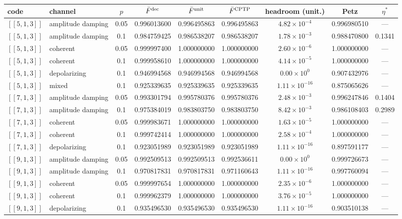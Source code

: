 \documentclass[10pt,a4paper]{article}
\begin{document}
\begin{longtable}{llccccccc}
\toprule code & channel & $p$ & $\bar F^{\rm dec}$ & $\bar F^{\rm unit}$ & $\bar F^{\rm CPTP}$ & headroom (unit.) & Petz & $\eta^\ast$ \\ \midrule
$[\![5,1,3]\!]$ & amplitude damping & 0.05 & 0.996013600 & 0.996495863 & 0.996495863 & $4.82\times 10^{-4}$ & 0.996980510 & --- \\
$[\![5,1,3]\!]$ & amplitude damping & 0.1 & 0.984759425 & 0.986538207 & 0.986538207 & $1.78\times 10^{-3}$ & 0.988470800 & 0.1341 \\
$[\![5,1,3]\!]$ & coherent & 0.05 & 0.999997400 & 1.000000000 & 1.000000000 & $2.60\times 10^{-6}$ & 1.000000000 & --- \\
$[\![5,1,3]\!]$ & coherent & 0.1 & 0.999958610 & 1.000000000 & 1.000000000 & $4.14\times 10^{-5}$ & 1.000000000 & --- \\
$[\![5,1,3]\!]$ & depolarizing & 0.1 & 0.946994568 & 0.946994568 & 0.946994568 & $0.00\times 10^{0}$ & 0.907432976 & --- \\
$[\![5,1,3]\!]$ & mixed & 0.1 & 0.925339635 & 0.925339635 & 0.925339635 & $1.11\times 10^{-16}$ & 0.875065626 & --- \\
\midrule
$[\![7,1,3]\!]$ & amplitude damping & 0.05 & 0.993301794 & 0.995780376 & 0.995780376 & $2.48\times 10^{-3}$ & 0.996247846 & 0.1404 \\
$[\![7,1,3]\!]$ & amplitude damping & 0.1 & 0.975384019 & 0.983803750 & 0.983803750 & $8.42\times 10^{-3}$ & 0.986108403 & 0.2989 \\
$[\![7,1,3]\!]$ & coherent & 0.05 & 0.999983671 & 1.000000000 & 1.000000000 & $1.63\times 10^{-5}$ & 1.000000000 & --- \\
$[\![7,1,3]\!]$ & coherent & 0.1 & 0.999742414 & 1.000000000 & 1.000000000 & $2.58\times 10^{-4}$ & 1.000000000 & --- \\
$[\![7,1,3]\!]$ & depolarizing & 0.1 & 0.923051989 & 0.923051989 & 0.923051989 & $1.11\times 10^{-16}$ & 0.897591177 & --- \\
\midrule
$[\![9,1,3]\!]$ & amplitude damping & 0.05 & 0.992509513 & 0.992509513 & 0.992536611 & $0.00\times 10^{0}$ & 0.999726673 & --- \\
$[\![9,1,3]\!]$ & amplitude damping & 0.1 & 0.970817831 & 0.970817831 & 0.971160643 & $1.11\times 10^{-16}$ & 0.997760094 & --- \\
$[\![9,1,3]\!]$ & coherent & 0.05 & 0.999997654 & 1.000000000 & 1.000000000 & $2.35\times 10^{-6}$ & 1.000000000 & --- \\
$[\![9,1,3]\!]$ & coherent & 0.1 & 0.999962379 & 1.000000000 & 1.000000000 & $3.76\times 10^{-5}$ & 1.000000000 & --- \\
$[\![9,1,3]\!]$ & depolarizing & 0.1 & 0.935496530 & 0.935496530 & 0.935496530 & $1.11\times 10^{-16}$ & 0.903510138 & --- \\
\midrule
\bottomrule\end{longtable}
\end{document}
